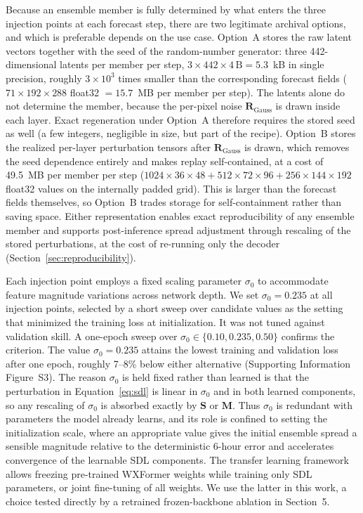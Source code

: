 \documentclass{agujournal2019}
\begin{document}
Because an ensemble member is fully determined by what enters the three injection points at each forecast step, there are two legitimate archival options, and which is preferable depends on the use case. Option~A stores the raw latent vectors together with the seed of the random-number generator: three 442-dimensional latents per member per step, $3 \times 442 \times 4\,\mathrm{B} = 5.3$~kB in single precision, roughly $3\times10^{3}$ times smaller than the corresponding forecast fields ($71 \times 192 \times 288$ float32 $= 15.7$~MB per member per step). The latents alone do not determine the member, because the per-pixel noise $\mathbf{R}_{\text{Gauss}}$ is drawn inside each layer. Exact regeneration under Option~A therefore requires the stored seed as well (a few integers, negligible in size, but part of the recipe). Option~B stores the realized per-layer perturbation tensors after $\mathbf{R}_{\text{Gauss}}$ is drawn, which removes the seed dependence entirely and makes replay self-contained, at a cost of 49.5~MB per member per step ($1024{\times}36{\times}48 + 512{\times}72{\times}96 + 256{\times}144{\times}192$ float32 values on the internally padded grid). This is larger than the forecast fields themselves, so Option~B trades storage for self-containment rather than saving space. Either representation enables exact reproducibility of any ensemble member and supports post-inference spread adjustment through rescaling of the stored perturbations, at the cost of re-running only the decoder (Section~\ref{sec:reproducibility}).

Each injection point employs a fixed scaling parameter $\sigma_0$ to accommodate feature magnitude variations across network depth. We set $\sigma_0 = 0.235$ at all injection points, selected by a short sweep over candidate values as the setting that minimized the training loss at initialization. It was not tuned against validation skill. A one-epoch sweep over $\sigma_0 \in \{0.10, 0.235, 0.50\}$ confirms the criterion. The value $\sigma_0 = 0.235$ attains the lowest training and validation loss after one epoch, roughly 7--8\% below either alternative (Supporting Information Figure~S3). The reason $\sigma_0$ is held fixed rather than learned is that the perturbation in Equation~\ref{eq:sdl} is linear in $\sigma_0$ and in both learned components, so any rescaling of $\sigma_0$ is absorbed exactly by $\mathbf{S}$ or $\mathbf{M}$. Thus $\sigma_0$ is redundant with parameters the model already learns, and its role is confined to setting the initialization scale, where an appropriate value gives the initial ensemble spread a sensible magnitude relative to the deterministic 6-hour error and accelerates convergence of the learnable SDL components. The transfer learning framework allows freezing pre-trained WXFormer weights while training only SDL parameters, or joint fine-tuning of all weights. We use the latter in this work, a choice tested directly by a retrained frozen-backbone ablation in Section~5.
\end{document}
